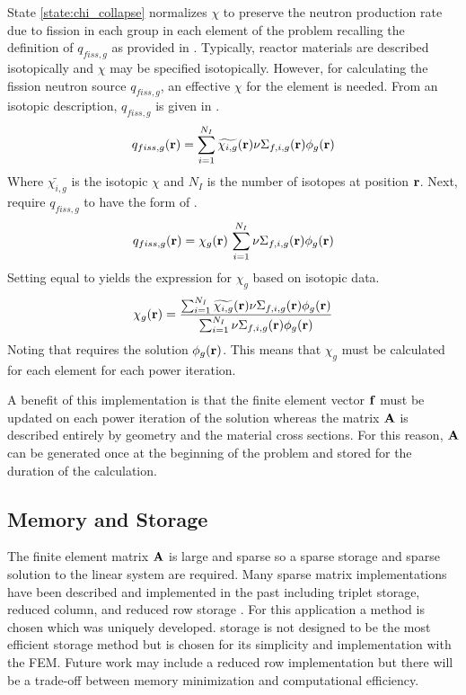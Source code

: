     State \ref{state:chi_collapse} normalizes $\chi$ to preserve the 
    neutron production rate due to fission in each group in each element of the
    problem recalling the definition of $q_{fiss,g}$ as provided in
    . Typically, reactor materials are described isotopically and 
    $\chi$ may be specified isotopically. However, for calculating the fission 
    neutron source $q_{fiss,g}$, an effective $\chi$ for the element is needed. 
    From an isotopic description, $q_{fiss,g}$ is given in 
    .
    \begin{equation}
      \label{eq:isotopic_chi}
      q_{fiss,g}(\mathbf{r}) = \sum_{i=1}^{N_I} \widetilde{\chi_{i,g}}(\mathbf{r})
        \nu \Sigma_{f,i,g}(\mathbf{r}) \phi_g(\mathbf{r})
    \end{equation}
    Where $\widetilde{\chi_{i,g}}$ is the isotopic $\chi$ and $N_I$ is the 
    number of isotopes at position $\mathbf{r}$. Next, require $q_{fiss,g}$ to have the 
    form of
    .
    \begin{equation}
      \label{eq:element_chi}
      q_{fiss,g}(\mathbf{r}) = \chi_g(\mathbf{r}) \, \sum_{i=1}^{N_I} \nu \Sigma_{f,i,g}(\mathbf{r})
        \phi_g(\mathbf{r})
    \end{equation}
    Setting  equal to  yields the
    expression for $\chi_g$ based on isotopic data.
    \begin{equation}
      \label{eq:chi_collapse}
      \chi_g(\mathbf{r}) = \frac{\sum_{i=1}^{N_I} \widetilde{\chi_{i,g}}(\mathbf{r})
        \nu \Sigma_{f,i,g}(\mathbf{r}) \phi_g(\mathbf{r})}
        {\sum_{i=1}^{N_I} \nu \Sigma_{f,i,g}(\mathbf{r}) \phi_g(\mathbf{r})}
    \end{equation}
    Noting that  requires the solution $\phi_g(\mathbf{r})$. This
    means that $\chi_g$ must be calculated for each element for each power
    iteration.
    
    A benefit of this implementation is that the finite element vector $\mathbf{f}$ 
    must be updated on each power iteration of the solution whereas the matrix 
    $\mathbf{A}$ is described entirely by geometry and the material cross sections. For
    this reason, $\mathbf{A}$ can be generated once at the beginning of the problem and 
    stored for the duration of the calculation.
    \FloatBarrier %

  \subsection{Memory and Storage}
    The finite element matrix $\mathbf{A}$ is large and sparse so a sparse storage and
    sparse solution to the linear system are required. Many sparse matrix 
    implementations have been described and implemented in the past including
    triplet storage, reduced column, and reduced row storage \cite{sparseBLAS}.
    For this application a \twotable method is chosen which was uniquely 
    developed. \twotable storage is not designed to be the most efficient 
    storage method but is chosen for its simplicity and implementation with the 
    FEM. Future work may include a reduced row implementation but there will be
    a trade-off between memory minimization and computational efficiency.
    
